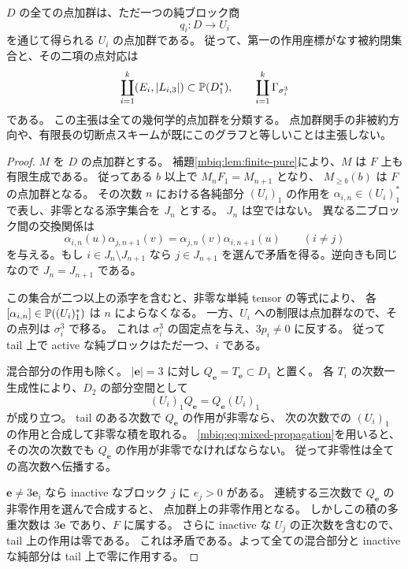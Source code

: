 \begin{theorem}[中心商の点加群]
\label{mbiq:thm:point-locus}
$D$ の全ての点加群は、ただ一つの純ブロック商
\begin{equation}\label{mbiq:eq:pure-quotient}
 q_i:D\longrightarrow U_i
\end{equation}
を通じて得られる $U_i$ の点加群である。
従って、第一の作用座標がなす被約閉集合と、その二項の点対応は
\begin{equation}\label{mbiq:eq:reduced-point-locus}
 \coprod_{i=1}^k(E_i,|L_{i,3}|)
       \subset\mathbb P(D_1^*),\qquad
 \coprod_{i=1}^k\Gamma_{\sigma_i^3}
\end{equation}
である。
この主張は全ての幾何学的点加群を分類する。
点加群関手の非被約方向や、有限長の切断点スキームが既にこのグラフと等しいことは主張しない。
\end{theorem}
\begin{proof}
$M$ を $D$ の点加群とする。
補題\ref{mbiq:lem:finite-pure}により、$M$ は $F$ 上も有限生成である。
従ってある $b$ 以上で $M_nF_1=M_{n+1}$ となり、
$M_{\geq b}(b)$ は $F$ の点加群となる。
その次数 $n$ における各純部分 $(U_i)_1$ の作用を
$\alpha_{i,n}\in(U_i)_1^*$ で表し、非零となる添字集合を $J_n$ とする。
$J_n$ は空ではない。
異なる二ブロック間の交換関係は
\[
 \alpha_{i,n}(u)\alpha_{j,n+1}(v)
 =\alpha_{j,n}(v)\alpha_{i,n+1}(u)
 \qquad(i\ne j)
\]
を与える。もし $i\in J_n\setminus J_{n+1}$ なら
$j\in J_{n+1}$ を選んで矛盾を得る。逆向きも同じなので $J_n=J_{n+1}$ である。

この集合が二つ以上の添字を含むと、非零な単純 tensor の等式により、
各 $[\alpha_{i,n}]\in\mathbb P((U_i)_1^*)$ は $n$ によらなくなる。
一方、$U_i$ への制限は点加群なので、その点列は $\sigma_i^3$ で移る。
これは $\sigma_i^3$ の固定点を与え、$3p_i\ne0$ に反する。
従って tail 上で active な純ブロックはただ一つ、$i$ である。

混合部分の作用も除く。
$|\boldsymbol e|=3$ に対し $Q_{\boldsymbol e}=T_{\boldsymbol e}\subset D_1$ と置く。
各 $T_i$ の次数一生成性により、$D_2$ の部分空間として
\begin{equation}\label{mbiq:eq:mixed-propagation}
 (U_i)_1Q_{\boldsymbol e}=Q_{\boldsymbol e}(U_i)_1
\end{equation}
が成り立つ。
tail のある次数で $Q_{\boldsymbol e}$ の作用が非零なら、
次の次数での $(U_i)_1$ の作用と合成して非零な積を取れる。
\eqref{mbiq:eq:mixed-propagation}を用いると、
その次の次数でも $Q_{\boldsymbol e}$ の作用が非零でなければならない。
従って非零性は全ての高次数へ伝播する。

$\boldsymbol e\ne3\boldsymbol e_i$ なら inactive なブロック $j$ に $e_j>0$ がある。
連続する三次数で $Q_{\boldsymbol e}$ の非零作用を選んで合成すると、
点加群上の非零作用となる。
しかしこの積の多重次数は $3\boldsymbol e$ であり、$F$ に属する。
さらに inactive な $U_j$ の正次数を含むので、tail 上の作用は零である。
これは矛盾である。よって全ての混合部分と inactive な純部分は tail 上で零に作用する。


\end{proof}
